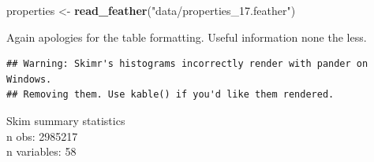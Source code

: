 \documentclass[]{book}
\newenvironment{Shaded}{\begin{snugshade}}{\end{snugshade}}
\newcommand{\KeywordTok}[1]{\textcolor[rgb]{0.13,0.29,0.53}{\textbf{#1}}}
\newcommand{\StringTok}[1]{\textcolor[rgb]{0.31,0.60,0.02}{#1}}
\newcommand{\OperatorTok}[1]{\textcolor[rgb]{0.81,0.36,0.00}{\textbf{#1}}}
\newcommand{\NormalTok}[1]{#1}
\theoremstyle{definition}
\theoremstyle{definition}
\theoremstyle{definition}
\theoremstyle{remark}
\begin{document}
\begin{Shaded}
\begin{Highlighting}[]
\NormalTok{properties <-}\StringTok{ }\KeywordTok{read_feather}\NormalTok{(}\StringTok{"data/properties_17.feather"}\NormalTok{)}
\end{Highlighting}
\end{Shaded}

Again apologies for the table formatting. Useful information none the
less.

\begin{Shaded}
\end{Shaded}

\begin{verbatim}
## Warning: Skimr's histograms incorrectly render with pander on Windows.
## Removing them. Use kable() if you'd like them rendered.
\end{verbatim}

Skim summary statistics\\
n obs: 2985217\\
n variables: 58
\end{document}
